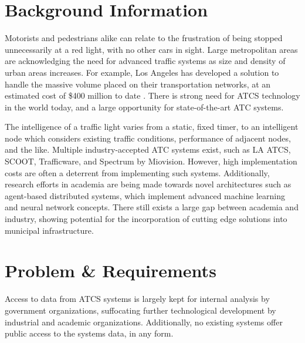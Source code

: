 \documentclass[a4paper,10pt]{article}
\begin{document}
\begin{multicols}{2}
\section{Background Information}
Motorists and pedestrians alike can relate to the frustration of being stopped unnecessarily at a red light, with no other cars in sight.
Large metropolitan areas are acknowledging the need for advanced traffic systems as size and density of urban areas increases.
For example, Los Angeles has developed a solution to handle the massive volume placed on their transportation networks, at an estimated cost of \$400 million to date \cite{la-atcs-article}.
There is strong need for ATCS technology in the world today, and a large opportunity for state-of-the-art ATC systems.

The intelligence of a traffic light varies from a static, fixed timer, to an intelligent node which considers existing traffic conditions, performance of adjacent nodes, and the like.
Multiple industry-accepted ATC systems exist, such as LA ATCS, SCOOT, Trafficware, and Spectrum by Miovision.
However, high implementation costs are often a deterrent from implementing such systems.
Additionally, research efforts in academia are being made towards novel architectures such as agent-based distributed systems, which implement advanced machine learning and neural network concepts\cite{1688100, 5073360, uot-article}.
There still exists a large gap between academia and industry, showing potential for the incorporation of cutting edge solutions into municipal infrastructure.


\section{Problem \& Requirements}

Access to data from ATCS systems is largely kept for internal analysis by government organizations, suffocating further technological development by industrial and academic organizations.
Additionally, no existing systems offer public access to the systems data, in any form.


\end{multicols}
\end{document}
